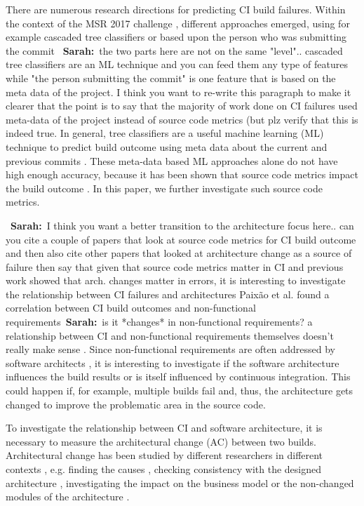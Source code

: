 \documentclass[sigplan, anonymous, review]{acmart}
\newcommand{\sn}[1]{{\color{blue}\textbf{Sarah:}~#1}}
\begin{document}
There are numerous research directions for predicting CI build failures. Within the context of the MSR 2017 challenge \cite{TravisTorrent}, different approaches emerged, using for example cascaded tree classifiers \cite{Pred-Cascade} or based upon the person who was submitting the commit \cite{ContrInvolv}~\sn{the two parts here are not on the same "level".. cascaded tree classifiers are an ML technique and you can feed them any type of features while "the person submitting the commit" is one feature that is based on the meta data of the project. I think you want to re-write this paragraph to make it clearer that the point is to say that the majority of work done on CI failures used meta-data of the project instead of source code metrics (but plz verify that this is indeed true}. In general, tree classifiers are a useful machine learning (ML) technique to predict build outcome using meta data about the current and previous commits \cite{Pred-Tree}. 
These meta-data based ML approaches alone do not have high enough accuracy, because it has been shown that source code metrics impact the build outcome \cite{FailsCorr}. In this paper, we further investigate such source code metrics.

~\sn{I think you want a better transition to the architecture focus here.. can you cite a couple of papers that look at source code metrics for CI build outcome and then also cite other papers that looked at architecture change as a source of failure then say that given that source code metrics matter in CI and previous work showed that arch. changes matter in errors, it is interesting to investigate the relationship between CI failures and architecture}s  Paix\~{a}o et al. found a correlation between CI build outcomes and non-functional requirements~\sn{is it *changes* in non-functional requirements? a relationship between CI and non-functional requirements themselves doesn't really make sense} \cite{Fail-NFReq}. Since non-functional requirements are often addressed by software architects \cite{NFR-Architects}, it is interesting to investigate if the software architecture influences the build results or is itself influenced by continuous integration. 
This could happen if, for example, multiple builds fail and, thus, the architecture gets changed to improve the problematic area in the source code.

To investigate the relationship between CI and software architecture, it is necessary to measure the architectural change (AC) between two builds. Architectural change has been studied by different researchers in different contexts \cite{Aramis,StructDist,Arc-MDSE,Arcade-Base} , e.g.  finding the causes \cite{AC-Causes}, checking consistency with the designed architecture \cite{ArcConf, ArcCons}, investigating the impact on the business model \cite{ArcChange-Business} or the non-changed modules of the architecture \cite{Knowledge-AC}. 
\end{document}
